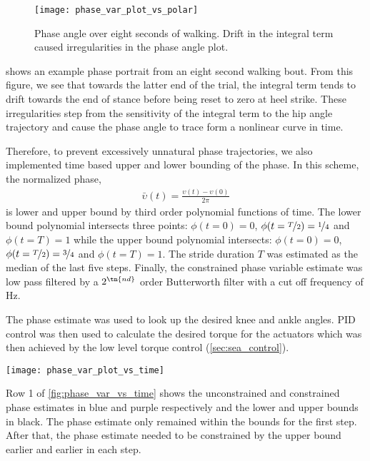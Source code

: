 \begin{figure}[t]
    \centering 
    \texttt{[image: phase\_var\_plot\_vs\_polar]}
    \caption[Phase angle over eight seconds of walking.]{Phase angle over eight
    seconds of walking. Drift in the integral term caused irregularities in the
    phase angle plot.}\label{fig:phase_var_polar}
\end{figure}
 shows an example phase portrait from an eight second
walking bout. From this figure, we see that towards the latter end of the trial,
the integral term tends to drift towards the end of stance before being reset to
zero at heel strike. These irregularities step from the sensitivity of the
integral term to the hip angle trajectory and cause the phase angle to trace
form a nonlinear curve in time.

Therefore, to prevent excessively unnatural phase trajectories, we also
implemented time based upper and lower bounding of the phase. In this scheme,
the normalized phase,
\begin{align}
    \bar \upsilon(t) = \frac{\upsilon(t) - \upsilon(0)}{2 \pi}
\end{align}
is lower and upper bound by third order polynomial functions of time. The lower
bound polynomial intersects three points: $\phi(t=0) = 0$,
$\phi(t=\nicefrac{T}{2}) = \nicefrac{1}{4}$ and $\phi(t = T) = 1$ while the
upper bound polynomial intersects: $\phi(t=0) = 0$,
$\phi(t=\nicefrac{T}{2}) = \nicefrac{3}{4}$ and $\phi(t = T) = 1$. The stride
duration $T$ was estimated as the median of the last five steps. Finally, the
constrained phase variable estimate was low pass filtered by a $2^\tn{nd}$ order
Butterworth filter with a cut off frequency of \unit[10]{Hz}.

The phase estimate was used to look up the desired knee and ankle angles. PID
control was then used to calculate the desired torque for the actuators which
was then achieved by the low level torque control (\cref{sec:sea_control}).

\begin{figure*}[t]
    \centering 
    \texttt{[image: phase\_var\_plot\_vs\_time]}
    \caption[Results from test of unified phase variable controller.]{Results
    from test of unified phase variable controller. Step to step variability
    causes significant divergence in the integral term, leading to an unstable
    phase estimate.}\label{fig:phase_var_vs_time}
\end{figure*}
Row 1 of \cref{fig:phase_var_vs_time} shows the unconstrained and constrained
phase estimates in blue and purple respectively and the lower and upper bounds
in black. The phase estimate only remained within the bounds for the first step.
After that, the phase estimate needed to be constrained by the upper bound
earlier and earlier in each step.

